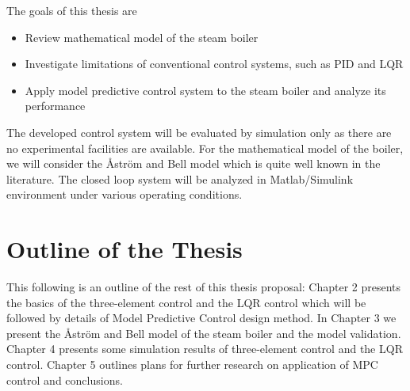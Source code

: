 The goals of this thesis are

\begin{itemize}
  \item Review mathematical model of the steam boiler
  \item Investigate limitations of conventional control systems, such as PID and LQR
  \item Apply model predictive control system to the steam boiler and analyze its performance
\end{itemize}

The developed control system will be evaluated by simulation only as there are no experimental facilities are available.  For the mathematical model of the boiler, we will consider the \r{A}str\"{o}m and Bell \cite{Astrom} model which is quite well known in the literature.  The closed loop system will be analyzed in Matlab/Simulink environment under various operating conditions. 

\section{Outline of the Thesis}

This following is an outline of the rest of this thesis proposal: Chapter 2 presents the basics of the three-element control and the LQR control which will be followed by details of Model Predictive Control design method.  In Chapter 3 we present the \r{A}str\"{o}m and Bell \cite{Astrom} model of the steam boiler and the model validation.  Chapter 4 presents some simulation results of three-element control and the LQR control.  Chapter 5 outlines plans for further research on application of MPC control and conclusions. 


